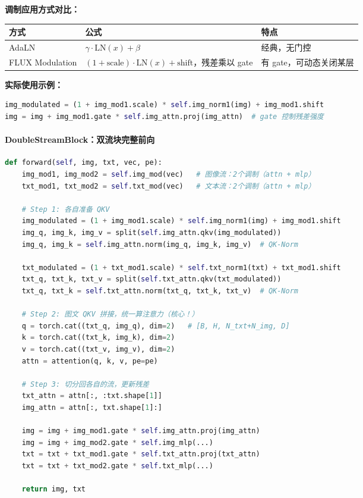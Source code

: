 \textbf{调制应用方式对比：}

\begin{summarybox}
\begin{center}
{\small
\begin{tabular}{p{3cm}p{5cm}p{4cm}}
\hline
\textbf{方式} & \textbf{公式} & \textbf{特点} \\
\hline
AdaLN & $\gamma \cdot \text{LN}(x) + \beta$ & 经典，无门控 \\
FLUX Modulation & $(1 + \text{scale}) \cdot \text{LN}(x) + \text{shift}$，残差乘以 gate & 有 gate，可动态关闭某层 \\
\hline
\end{tabular}
}
\end{center}
\end{summarybox}

\textbf{实际使用示例：}

\begin{lstlisting}[language=Python]
img_modulated = (1 + img_mod1.scale) * self.img_norm1(img) + img_mod1.shift
img = img + img_mod1.gate * self.img_attn.proj(img_attn)  # gate 控制残差强度
\end{lstlisting}

\paragraph{DoubleStreamBlock：双流块完整前向}

\begin{lstlisting}[language=Python]
def forward(self, img, txt, vec, pe):
    img_mod1, img_mod2 = self.img_mod(vec)   # 图像流：2个调制（attn + mlp）
    txt_mod1, txt_mod2 = self.txt_mod(vec)   # 文本流：2个调制（attn + mlp）

    # Step 1: 各自准备 QKV
    img_modulated = (1 + img_mod1.scale) * self.img_norm1(img) + img_mod1.shift
    img_q, img_k, img_v = split(self.img_attn.qkv(img_modulated))
    img_q, img_k = self.img_attn.norm(img_q, img_k, img_v)  # QK-Norm

    txt_modulated = (1 + txt_mod1.scale) * self.txt_norm1(txt) + txt_mod1.shift
    txt_q, txt_k, txt_v = split(self.txt_attn.qkv(txt_modulated))
    txt_q, txt_k = self.txt_attn.norm(txt_q, txt_k, txt_v)  # QK-Norm

    # Step 2: 图文 QKV 拼接，统一算注意力（核心！）
    q = torch.cat((txt_q, img_q), dim=2)   # [B, H, N_txt+N_img, D]
    k = torch.cat((txt_k, img_k), dim=2)
    v = torch.cat((txt_v, img_v), dim=2)
    attn = attention(q, k, v, pe=pe)

    # Step 3: 切分回各自的流，更新残差
    txt_attn = attn[:, :txt.shape[1]]
    img_attn = attn[:, txt.shape[1]:]

    img = img + img_mod1.gate * self.img_attn.proj(img_attn)
    img = img + img_mod2.gate * self.img_mlp(...)
    txt = txt + txt_mod1.gate * self.txt_attn.proj(txt_attn)
    txt = txt + txt_mod2.gate * self.txt_mlp(...)

    return img, txt
\end{lstlisting}

